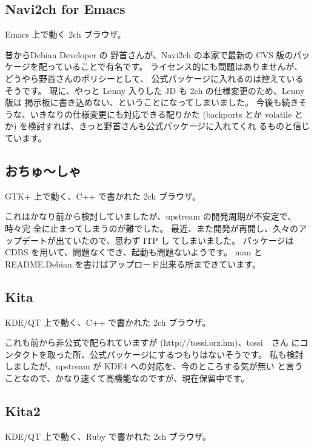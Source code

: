 \documentclass[mingoth,a4paper]{jsarticle}
\begin{document}
\subsection{Navi2ch for Emacs}

%
{Emacs 上で動く 2ch ブラウザ。}

昔からDebian Developer の
野首さんが、Navi2ch の本家で最新の CVS 版のパッケージを配っていることで有名です。
ライセンス的にも問題はありませんが、どうやら野首さんのポリシーとして、
公式パッケージに入れるのは控えているそうです。
現に、やっと Lenny 入りした JD も 2ch の仕様変更のため、Lenny 版は
掲示板に書き込めない、ということになってしまいました。
今後も続きそうな、いきなりの仕様変更にも対応できる配りかた (backports とか
volatile とか) を検討すれば、きっと野首さんも公式パッケージに入れてくれ
るものと信じています。

\subsection{おちゅ〜しゃ}

%
{GTK+ 上で動く、C++ で書かれた 2ch ブラウザ。}

これはかなり前から検討していましたが、upstream の開発周期が不安定で、時々完
全に止まってしまうのが難でした。
最近、また開発が再開し、久々のアップデートが出ていたので、思わず ITP し
てしまいました。
パッケージは CDBS を用いて、問題なくでき、起動も問題ないようです。
man と README.Debian を書けばアップロード出来る所まできています。

\subsection{Kita}

%
{KDE/QT 上で動く、C++ で書かれた 2ch ブラウザ。}

これも前から非公式で配られていますが (http://tossi.orz.hm)、tossi　さん
にコンタクトを取った所、公式パッケージにするつもりはないそうです。
私も検討しましたが、upstream が KDE4 への対応を、今のところする気が無い
と言うことなので、かなり速くて高機能なのですが、現在保留中です。

\subsection{Kita2}

%
{KDE/QT 上で動く、Ruby で書かれた 2ch ブラウザ。}
\end{document}
